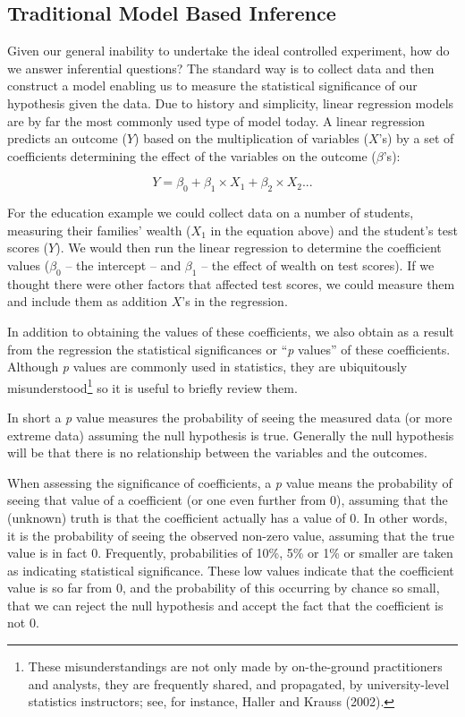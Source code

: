 \documentclass[]{memoir}
\begin{document}
\subsection{Traditional Model Based Inference}

Given our general inability to undertake the ideal controlled
experiment, how do we answer inferential questions? The standard way is
to collect data and then construct a model enabling us to measure the
statistical significance of our hypothesis given the data. Due to
history and simplicity, linear regression models are by far the most
commonly used type of model today. A linear regression predicts an
outcome ($Y$) based on the multiplication of variables ($X$'s) by a set
of coefficients determining the effect of the variables on the outcome
($\beta$'s):

\[ Y = \beta_0 + \beta_1 \times X_1 + \beta_2 \times X_2 ... \]

For the education example we could collect data on a number of students,
measuring their families' wealth ($X_1$ in the equation above) and the
student's test scores ($Y$). We would then run the linear regression to
determine the coefficient values ($\beta_0$ -- the intercept -- and
$\beta_1$ -- the effect of wealth on test scores). If we thought there
were other factors that affected test scores, we could measure them and
include them as addition $X$'s in the regression.

In addition to obtaining the values of these coefficients, we also
obtain as a result from the regression the statistical significances or
``\emph{p} values'' of these coefficients. Although \emph{p} values are
commonly used in statistics, they are ubiquitously
misunderstood\footnote{These misunderstandings are not only made by
  on-the-ground practitioners and analysts, they are frequently shared,
  and propagated, by university-level statistics instructors; see, for
  instance, Haller and Krauss (2002).} so it is useful to briefly review
them.

In short a \emph{p} value measures the probability of seeing the
measured data (or more extreme data) assuming the null hypothesis is
true. Generally the null hypothesis will be that there is no
relationship between the variables and the outcomes.

When assessing the significance of coefficients, a \emph{p} value means
the probability of seeing that value of a coefficient (or one even
further from 0), assuming that the (unknown) truth is that the
coefficient actually has a value of 0. In other words, it is the
probability of seeing the observed non-zero value, assuming that the
true value is in fact 0. Frequently, probabilities of 10\%, 5\% or 1\%
or smaller are taken as indicating statistical significance. These low
values indicate that the coefficient value is so far from 0, and the
probability of this occurring by chance so small, that we can reject the
null hypothesis and accept the fact that the coefficient is not 0.
\end{document}
